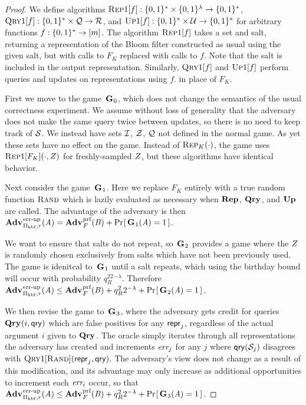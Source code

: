 \begin{proof}We define algorithms $\textsc{Rep}1[f]: \{0,1\}^* \times \{0,1\}^\lambda \to \{0,1\}^*$, $\textsc{Qry}1[f]: \{0,1\}^* \times \mathcal{Q} \to \mathcal{R}$, and $\textsc{Up}1[f]: \{0,1\}^* \times \mathcal{U} \to \{0,1\}^*$ for arbitrary functions $f: \{0,1\}^* \to [m]$. The algorithm $\textsc{Rep}1[f]$ takes a set and salt, returning a representation of the Bloom filter constructed as usual using the given salt, but with calls to $F_K$ replaced with calls to $f$. Note that the salt is included in the output representation. Similarly, $\textsc{Qry}1[f]$ and $\textsc{Up}1[f]$ perform queries and updates on representations using $f$. in place of $F_K$.

First we move to the game~$\mathbf{G}\hspace{0.5pt}_0$, which does not change the semantics of the usual correctness experiment. We assume without loss of generality that the adversary does not make the same query twice between updates, so there is no need to keep track of $\mathcal{S}$. We instead have sets $\mathcal{I}$, $\mathcal{Z}$, $\mathcal{Q}$ not defined in the normal game. As yet these sets have no effect on the game. Instead of $\textsc{Rep}_K(\cdot)$, the game uses $\textsc{Rep}1[F_K](\cdot,Z)$ for freshly-sampled $Z$, but these algorithms have identical behavior.

Next consider the game~$\mathbf{G}\hspace{0.5pt}_1$. Here we replace $F_K$ entirely with a true random function $\textsc{Rand}$ which is lazily evaluated as necessary when $\mathbf{Rep}\hspace{0.5pt}$, $\mathbf{Qry}\hspace{0.5pt}$, and $\mathbf{Up}\hspace{0.5pt}$ are called. The advantage of the adversary is then $\Adv{\errep}_{\struct_\prfbloom,r}(\advA) = \Adv{\prf}_F(\advB) + \Prob{\game_1(\advA)=1}$.

We want to ensure that salts do not repeat, so~$\mathbf{G}\hspace{0.5pt}_2$ provides a game where the $Z$ is randomly chosen exclusively from salts which have not been previously used. The game is idenitcal to~$\mathbf{G}\hspace{0.5pt}_1$ until a salt repeats, which using the birthday bound will occur with probability $q_R^22^{-\lambda}$. Therefore $\Adv{\errep}_{\struct_\prfbloom,r}(\advA) \le \Adv{\prf}_F(\advB) + q_R^22^{-\lambda} + \Prob{\game_2(\advA)=1}$.

We then revise the game to~$\mathbf{G}\hspace{0.5pt}_3$, where the adversary gets credit for queries $\mathbf{Qry}\hspace{0.5pt}(i,\mathsf{qry})$ which are false positives for any $\mathsf{repr}_j$, regardless of the actual argument $i$ given to $\mathbf{Qry}\hspace{0.5pt}$. The oracle simply iterates through all representations the adversary has created and increments $\textit{err}_j$ for any $j$ where $\mathsf{qry}(\mathcal{S}_j)$ disagrees with $\textsc{Qry}1[\textsc{Rand}](\mathsf{repr}_j,\mathsf{qry})$. The adversary's view does not change as a result of this modification, and its advantage may only increase as additional opportunities to increment each $\textit{err}_i$ occur, so that $\Adv{\errep}_{\struct_\prfbloom,r}(\advA) \le \Adv{\prf}_F(\advB) + q_R^22^{-\lambda} + \Prob{\game_3(\advA)=1}$.


\end{proof}
